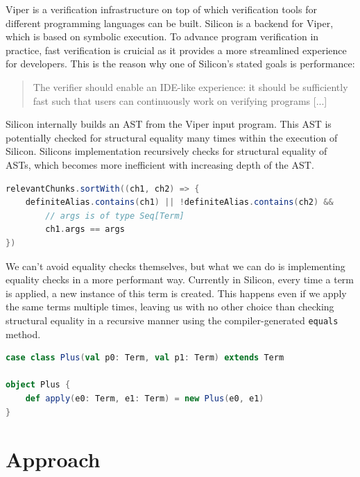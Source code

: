 \documentclass[11pt]{article}
\begin{document}
    Viper \cite{viper} is a verification infrastructure on top of which verification tools
    for different programming languages can be built. Silicon \cite{silicon} is a backend for Viper,
    which is based on symbolic execution. To advance program verification in practice,
    fast verification is cruicial as it provides a more streamlined experience for developers.
    This is the reason why one of Silicon's stated goals is performance:

    \begin{quote} 
        The verifier should enable an IDE-like experience: it should be
        sufficiently fast such that users can continuously work on verifying
        programs [...] \cite{silicon}
    \end{quote}

    Silicon internally builds an AST from the Viper input
    program. This AST is potentially checked for structural equality many times within
    the execution of Silicon. Silicons implementation recursively checks for structural
    equality of ASTs, which becomes more inefficient with increasing depth of the AST.

    \begin{lstlisting}[language=Scala, caption=Example of multiple subtree ("term") equality checks occuring in Silicon's exhale supporter.]
relevantChunks.sortWith((ch1, ch2) => {
    definiteAlias.contains(ch1) || !definiteAlias.contains(ch2) &&
        // args is of type Seq[Term]
        ch1.args == args
})
    \end{lstlisting}

    We can't avoid equality checks themselves, but what we can do is implementing
    equality checks in a more performant way. Currently in Silicon, every time a term is applied,
    a new instance of this term is created. This happens even if we apply the same
    terms multiple times, leaving us with no other choice than checking structural
    equality in a recursive manner using the compiler-generated \texttt{equals} method.

    \begin{lstlisting}[language=Scala, caption=Simplification of how term instances currently are created.]
case class Plus(val p0: Term, val p1: Term) extends Term
    
object Plus {
    def apply(e0: Term, e1: Term) = new Plus(e0, e1)
}
    \end{lstlisting}
  
    \section{Approach} \label{approach}
\end{document}
